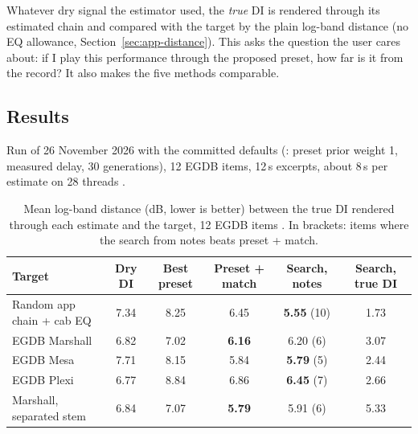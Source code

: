 \begin{keyidea}
Whatever dry signal the estimator used, the \emph{true} DI is rendered through
its estimated chain and compared with the target by the plain log-band distance
(no EQ allowance, Section~\ref{sec:app-distance}). This asks the question the
user cares about: if I play this performance through the proposed preset, how
far is it from the record? It also makes the five methods comparable.
\end{keyidea}

\subsection{Results}

Run of 26 November 2026 with the committed defaults (: preset
prior weight 1, measured delay, 30 generations), 12 EGDB items, 12\,s excerpts,
about 8\,s per estimate on 28 threads \measured.

\begin{table}[h]
\centering
\caption{Mean log-band distance (dB, lower is better) between the true DI
rendered through each estimate and the target, 12 EGDB items \measured. In
brackets: items where the search from notes beats preset + match.}
\label{tab:tone-results}
\footnotesize
\setlength{\tabcolsep}{4pt}
\begin{tabular}{@{}lccccc@{}}
\toprule
Target & Dry DI & Best preset & Preset + match & Search, notes & Search, true DI \\
\midrule
Random app chain + cab EQ & 7.34 & 8.25 & 6.45 & \textbf{5.55} (10) & 1.73 \\
EGDB Marshall & 6.82 & 7.02 & \textbf{6.16} & 6.20 (6) & 3.07 \\
EGDB Mesa & 7.71 & 8.15 & 5.84 & \textbf{5.79} (5) & 2.44 \\
EGDB Plexi & 6.77 & 8.84 & 6.86 & \textbf{6.45} (7) & 2.66 \\
Marshall, separated stem & 6.84 & 7.07 & \textbf{5.79} & 5.91 (6) & 5.33 \\
\bottomrule
\end{tabular}
\end{table}

